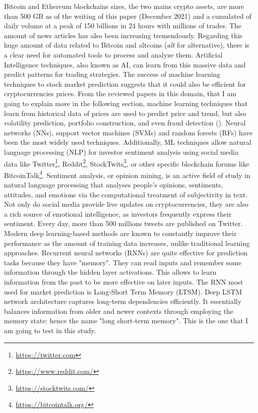 \documentclass{article}
\begin{document}
	Bitcoin and Ethereum blockchains sizes, the two mains crypto assets, are more than 500 GB as of the writing of this paper (December 2021) and a cumulated of daily volume at a peak of 150 billions in 24 hours with millions of trades. The amount of news articles has also been increasing tremendously. Regarding this huge amount of data related to Bitcoin and altcoins (\textit{alt} for alternative), there is a clear need for automated tools to process and analyze them. Artificial Intelligence techniques, also known as AI, can learn from this massive data and predict patterns for trading strategies. The success of machine learning techniques to stock market prediction suggests that it could also be efficient for cryptocurrencies prices. From the reviewed papers in this domain, that I am going to explain more in the following section, machine learning techniques that learn from historical data of prices are used to predict price and trend, but also volatility prediction, portfolio construction, and even fraud detection (\cite{ibru}). Neural networks (NNs), support vector machines (SVMs) and random forests (RFs) have been the most widely used techniques. Additionally, ML techniques allow natural language processing (NLP) for investor sentiment analysis using social media data like Twitter\footnote{\href{https://twitter.com}{https://twitter.com}}, Reddit\footnote{\href{https://www.reddit.com/}{https://www.reddit.com/}}, StockTwits\footnote{\href{https://stocktwits.com/}{https://stocktwits.com/}}, or other specific blockchain forums like BitcoinTalk\footnote{\href{https://bitcointalk.org/}{https://bitcointalk.org/}}. Sentiment analysis, or opinion mining, is an active field of study in natural language processing that analyses people’s opinions, sentiments, attitudes, and emotions via the computational treatment of subjectivity in text. Not only do social media provide live updates on cryptocurrencies, they are also a rich source of emotional intelligence, as investors frequently express their sentiment. Every day, more than 500 millions tweets are published on Twitter. Modern deep learning-based methods are known to constantly improve their performance as the amount of training data increases, unlike traditional learning approaches. Recurrent neural networks (RNNs) are quite effective for prediction tasks because they have "memory". They can read inputs and remember some information through the hidden layer activations. This allows to learn information from the past to be more effective on later inputs. The RNN most used for market prediction is Long-Short Term Memory (LTSM). Deep LSTM network architecture captures long-term dependencies efficiently. It essentially balances information from older and newer contexts through employing the memory state: hence the name "long short-term memory". This is the one that I am going to test in this study.
	
\end{document}
